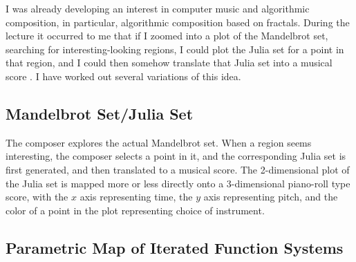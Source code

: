 \documentclass[11pt,papersize=a4]{scrartcl}
\begin{document}
I was already developing an interest in computer music and algorithmic composition, in particular, algorithmic composition based on fractals. During the lecture it occurred to me that if I zoomed into a plot of the Mandelbrot set, searching for interesting-looking regions, I could plot the Julia set for a point in that region, and I could then somehow translate that Julia set into a musical score \parencite{obsessed}. I have worked out several variations of this idea.

\subsection*{Mandelbrot Set/Julia Set}

The composer explores the actual Mandelbrot set. When a region seems interesting, the composer selects a point in it, and the corresponding Julia set is first generated, and then translated to a musical score. The 2-dimensional plot of the Julia set is mapped more or less directly onto a 3-dimensional piano-roll type score, with the $x$ axis representing time, the $y$ axis representing pitch, and the color of a point in the plot representing choice of instrument.

\subsection*{Parametric Map of Iterated Function Systems}
\end{document}
